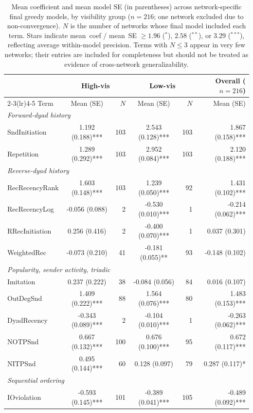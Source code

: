 \begin{table}[htbp]
\centering
\small
\caption{Mean coefficient and mean model SE (in parentheses) across network-specific final greedy models, by visibility group ($n=216$; one network excluded due to non-convergence). $N$ is the number of networks whose final model included each term. Stars indicate mean~coef / mean~SE $\geq 1.96$ ($^*$), $2.58$ ($^{**}$), or $3.29$ ($^{***}$), reflecting average within-model precision. Terms with $N \leq 3$ appear in very few networks; their entries are included for completeness but should not be treated as evidence of cross-network generalizability.}
\label{tab:final_coefs}
\begin{tabular}{lcrcrr}
\toprule
& \multicolumn{2}{c}{High-vis} & \multicolumn{2}{c}{Low-vis} & Overall ($n=216$) \\
\cmidrule(lr){2-3}\cmidrule(lr){4-5}
Term & Mean (SE) & $N$ & Mean (SE) & $N$ & Mean (SE) \\
\midrule
\multicolumn{6}{l}{\textit{Forward-dyad history}} \\
\quad SndInitiation & 1.192 (0.188)*** & 103 & 2.543 (0.128)*** & 103 & 1.867 (0.158)*** \\
\quad Repetition & 1.289 (0.292)*** & 103 & 2.952 (0.084)*** & 103 & 2.120 (0.188)*** \\
\multicolumn{6}{l}{\textit{Reverse-dyad history}} \\
\quad RecRecencyRank & 1.603 (0.148)*** & 103 & 1.239 (0.050)*** & 92 & 1.431 (0.102)*** \\
\quad RecRecencyLog & -0.056 (0.088) & 2 & -0.530 (0.010)*** & 1 & -0.214 (0.062)*** \\
\quad RRecInitiation & 0.256 (0.416) & 2 & -0.400 (0.070)*** & 1 & 0.037 (0.301) \\
\quad WeightedRec & -0.073 (0.210) & 41 & -0.181 (0.055)** & 93 & -0.148 (0.102) \\
\multicolumn{6}{l}{\textit{Popularity, sender activity, triadic}} \\
\quad Imitation & 0.237 (0.222) & 38 & -0.084 (0.056) & 84 & 0.016 (0.107) \\
\quad OutDegSnd & 1.409 (0.222)*** & 88 & 1.564 (0.076)*** & 80 & 1.483 (0.153)*** \\
\quad DyadRecency & -0.343 (0.089)*** & 2 & -0.104 (0.010)*** & 1 & -0.263 (0.062)*** \\
\quad NOTPSnd & 0.667 (0.132)*** & 100 & 0.676 (0.100)*** & 95 & 0.672 (0.117)*** \\
\quad NITPSnd & 0.495 (0.144)*** & 60 & 0.128 (0.097) & 79 & 0.287 (0.117)* \\
\multicolumn{6}{l}{\textit{Sequential ordering}} \\
\quad IOviolation & -0.593 (0.145)*** & 101 & -0.389 (0.041)*** & 105 & -0.489 (0.092)*** \\
\bottomrule
\end{tabular}
\end{table}
